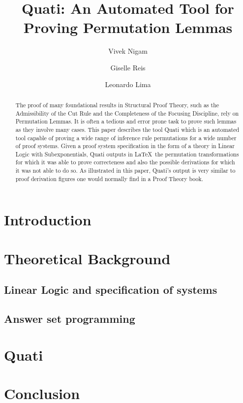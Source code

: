 \documentclass{llncs}
\title{Quati: An Automated Tool for Proving Permutation Lemmas}
\author{Vivek Nigam\inst{1} \and Giselle Reis\inst{2} \and Leonardo Lima\inst{1}}
\institute{Universidade Federal da Para\'{i}ba, Brazil
\and Technische Universit\"{a}t Wien, Austria
}
\begin{document}
\maketitle

\begin{abstract}
The proof of many foundational results in Structural Proof Theory, such as the Admissibility of the Cut Rule and 
the Completeness of the Focusing Discipline, rely on Permutation Lemmas. It is often a tedious and error prone  
task to prove such lemmas as they involve many cases. This paper describes the tool Quati which is an automated tool capable of proving
a wide range of inference rule permutations for a wide number of proof systems. Given a proof system specification 
in the form of a theory in Linear Logic with Subexponentials, Quati
outputs in \LaTeX\ the permutation transformations for which it was able to prove correcteness and also the 
possible derivations for which it was not able to do so. As illustrated in this paper, Quati's output is very similar to 
proof derivation figures one would normally find in a Proof Theory book. 

\end{abstract}

\section{Introduction}

\section{Theoretical Background}


\subsection{Linear Logic and specification of systems}

\subsection{Answer set programming}

\section{Quati}


\section{Conclusion}
\end{document}
